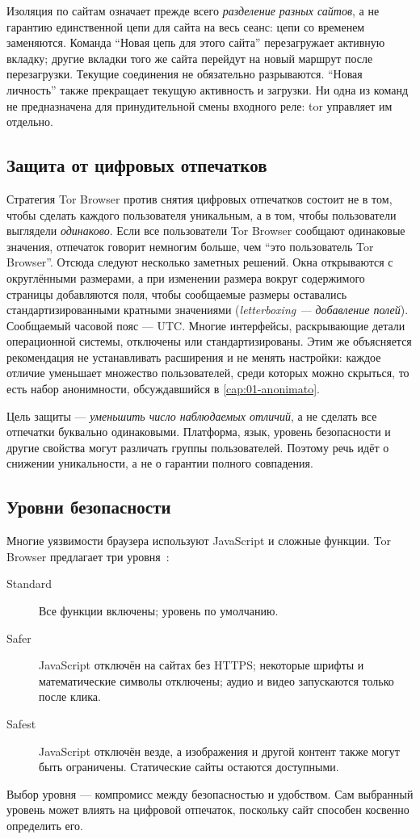 Изоляция по сайтам означает прежде всего \emph{разделение разных сайтов}, а не гарантию единственной цепи для сайта на весь сеанс: цепи со временем заменяются. Команда \enquote{Новая цепь для этого сайта} перезагружает активную вкладку; другие вкладки того же сайта перейдут на новый маршрут после перезагрузки. Текущие соединения не обязательно разрываются. \enquote{Новая личность} также прекращает текущую активность и загрузки. Ни одна из команд не предназначена для принудительной смены входного реле: tor управляет им отдельно.

\subsection{Защита от цифровых отпечатков}

Стратегия Tor Browser против снятия цифровых отпечатков состоит не в том, чтобы сделать каждого пользователя уникальным, а в том, чтобы пользователи выглядели \emph{одинаково}. Если все пользователи Tor Browser сообщают одинаковые значения, отпечаток говорит немногим больше, чем \enquote{это пользователь Tor Browser}. Отсюда следуют несколько заметных решений. Окна открываются с округлёнными размерами, а при изменении размера вокруг содержимого страницы добавляются поля, чтобы сообщаемые размеры оставались стандартизированными кратными значениями (\emph{letterboxing — добавление полей}). Сообщаемый часовой пояс — UTC. Многие интерфейсы, раскрывающие детали операционной системы, отключены или стандартизированы. Этим же объясняется рекомендация не устанавливать расширения и не менять настройки: каждое отличие уменьшает множество пользователей, среди которых можно скрыться, то есть набор анонимности, обсуждавшийся в \cref{cap:01-anonimato}.

Цель защиты — \emph{уменьшить число наблюдаемых отличий}, а не сделать все отпечатки буквально одинаковыми. Платформа, язык, уровень безопасности и другие свойства могут различать группы пользователей. Поэтому речь идёт о снижении уникальности, а не о гарантии полного совпадения.

\subsection{Уровни безопасности}

Многие уязвимости браузера используют JavaScript и сложные функции. Tor Browser предлагает три уровня~\cite{tbmanual}:
\begin{description}
  \item[Standard] Все функции включены; уровень по умолчанию.
  \item[Safer] JavaScript отключён на сайтах без HTTPS; некоторые шрифты и математические символы отключены; аудио и видео запускаются только после клика.
  \item[Safest] JavaScript отключён везде, а изображения и другой контент также могут быть ограничены. Статические сайты остаются доступными.
\end{description}
Выбор уровня — компромисс между безопасностью и удобством. Сам выбранный уровень может влиять на цифровой отпечаток, поскольку сайт способен косвенно определить его.

